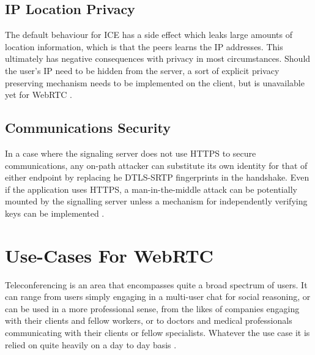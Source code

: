 \subsection{IP Location Privacy}
The default behaviour for ICE has a side effect which leaks large amounts of location information, which is that the peers learns the IP addresses. This ultimately has negative consequences with privacy in most circumstances. Should the user’s IP need to be hidden from the server, a sort of explicit privacy preserving mechanism needs to be implemented on the client, but is unavailable yet for WebRTC \cite{rescorla2013webrtc}.

\subsection{Communications Security}
In a case where the signaling server does not use HTTPS to secure communications, any on-path attacker can substitute its own identity for that of either endpoint by replacing he DTLS-SRTP fingerprints in the handshake.
Even if the application uses HTTPS, a man-in-the-middle attack can be potentially mounted by the signalling server unless a mechanism for independently verifying keys can be implemented \cite{rescorla2013webrtc}.

\section{Use-Cases For WebRTC}
Teleconferencing is an area that encompasses quite a broad spectrum of users. It can range from users simply engaging in a multi-user chat for social reasoning, or can be used in a more professional sense, from the likes of companies engaging with their clients and fellow workers, or to doctors and medical professionals communicating with their clients or fellow specialists. Whatever the use case it is relied on quite heavily on a day to day basis \cite{14003034520191201}.

